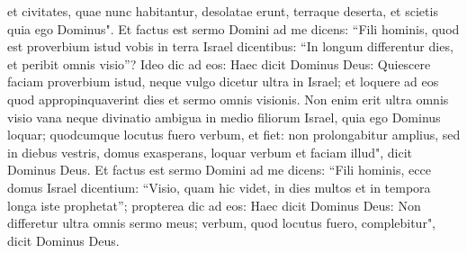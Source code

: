 \begin{biblechapter}
\verse et civitates, quae nunc habitantur, desolatae erunt, terraque deserta, et scietis quia ego Dominus". 
\verse Et factus est sermo Domini ad me dicens: 
\verse “Fili hominis, quod est proverbium istud vobis in terra Israel dicentibus: “In longum differentur dies, et peribit omnis visio”? 
\verse Ideo dic ad eos: Haec dicit Dominus Deus: Quiescere faciam proverbium istud, neque vulgo dicetur ultra in Israel; et loquere ad eos quod appropinquaverint dies et sermo omnis visionis. 
\verse Non enim erit ultra omnis visio vana neque divinatio ambigua in medio filiorum Israel, 
\verse quia ego Dominus loquar; quodcumque locutus fuero verbum, et fiet: non prolongabitur amplius, sed in diebus vestris, domus exasperans, loquar verbum et faciam illud", dicit Dominus Deus. 
\verse Et factus est sermo Domini ad me dicens: 
\verse “Fili hominis, ecce domus Israel dicentium: “Visio, quam hic videt, in dies multos et in tempora longa iste prophetat”; 
\verse propterea dic ad eos: Haec dicit Dominus Deus: Non differetur ultra omnis sermo meus; verbum, quod locutus fuero, complebitur", dicit Dominus Deus. 
\end{biblechapter}

